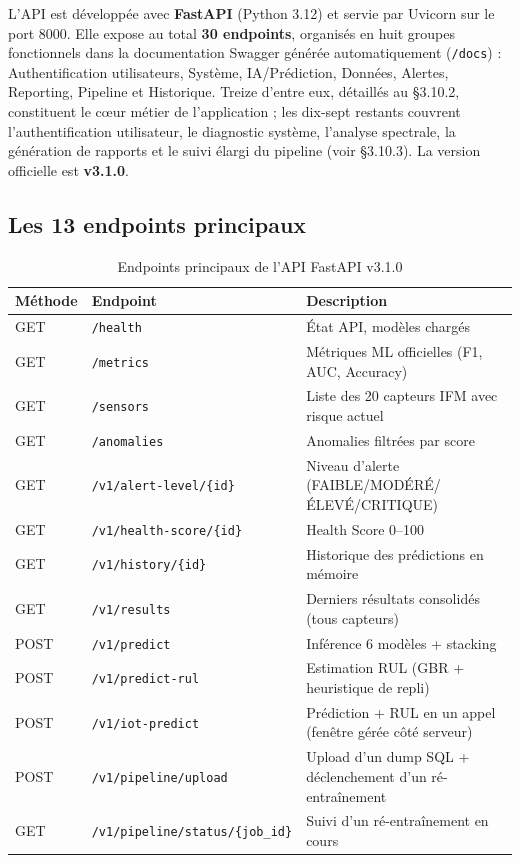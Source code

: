 \documentclass[12pt,a4paper]{report}
\begin{document}
L'API est développée avec \textbf{FastAPI} (Python 3.12) et servie par Uvicorn sur le
port 8000. Elle expose au total \textbf{30 endpoints}, organisés en huit groupes
fonctionnels dans la documentation Swagger générée automatiquement
(\texttt{/docs}) : Authentification utilisateurs, Système, IA/Prédiction, Données,
Alertes, Reporting, Pipeline et Historique. Treize d'entre eux, détaillés au §3.10.2,
constituent le cœur métier de l'application ; les dix-sept restants couvrent
l'authentification utilisateur, le diagnostic système, l'analyse spectrale, la
génération de rapports et le suivi élargi du pipeline (voir §3.10.3). La version
officielle est \textbf{v3.1.0}.

\subsection{Les 13 endpoints principaux}

\begin{table}[H]
\centering
\caption{Endpoints principaux de l'API FastAPI v3.1.0}
\begin{tabular}{llp{5.5cm}}
\toprule
\textbf{Méthode} & \textbf{Endpoint} & \textbf{Description} \\
\midrule
GET  & \texttt{/health}                        & État API, modèles chargés \\
GET  & \texttt{/metrics}                       & Métriques ML officielles (F1, AUC, Accuracy) \\
GET  & \texttt{/sensors}                       & Liste des 20 capteurs IFM avec risque actuel \\
GET  & \texttt{/anomalies}                     & Anomalies filtrées par score \\
GET  & \texttt{/v1/alert-level/\{id\}}         & Niveau d'alerte (FAIBLE/MODÉRÉ/ÉLEVÉ/CRITIQUE) \\
GET  & \texttt{/v1/health-score/\{id\}}        & Health Score 0--100 \\
GET  & \texttt{/v1/history/\{id\}}             & Historique des prédictions en mémoire \\
GET  & \texttt{/v1/results}                    & Derniers résultats consolidés (tous capteurs) \\
POST & \texttt{/v1/predict}                     & Inférence 6 modèles + stacking \\
POST & \texttt{/v1/predict-rul}                 & Estimation RUL (GBR + heuristique de repli) \\
POST & \texttt{/v1/iot-predict}                 & Prédiction + RUL en un appel (fenêtre gérée côté serveur) \\
POST & \texttt{/v1/pipeline/upload}             & Upload d'un dump SQL + déclenchement d'un ré-entraînement \\
GET  & \texttt{/v1/pipeline/status/\{job\_id\}} & Suivi d'un ré-entraînement en cours \\
\bottomrule
\end{tabular}
\end{table}
\end{document}
